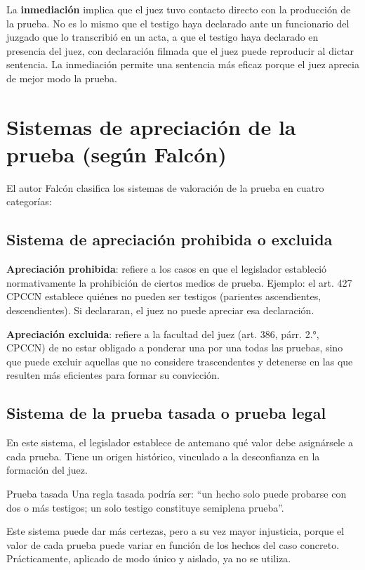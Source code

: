 \documentclass[12pt,oneside]{book}
\begin{document}
La \textbf{inmediación} implica que el juez tuvo contacto directo con la producción de la prueba. No es lo mismo que el testigo haya declarado ante un funcionario del juzgado que lo transcribió en un acta, a que el testigo haya declarado en presencia del juez, con declaración filmada que el juez puede reproducir al dictar sentencia. La inmediación permite una sentencia más eficaz porque el juez aprecia de mejor modo la prueba.

\section{Sistemas de apreciación de la prueba (según Falcón)}

El autor Falcón clasifica los sistemas de valoración de la prueba en cuatro categorías:

\subsection{Sistema de apreciación prohibida o excluida}

\textbf{Apreciación prohibida}: refiere a los casos en que el legislador estableció normativamente la prohibición de ciertos medios de prueba. Ejemplo: el art. 427 CPCCN establece quiénes no pueden ser testigos (parientes ascendientes, descendientes). Si declararan, el juez no puede apreciar esa declaración.

\textbf{Apreciación excluida}: refiere a la facultad del juez (art. 386, párr. 2.°, CPCCN) de no estar obligado a ponderar una por una todas las pruebas, sino que puede excluir aquellas que no considere trascendentes y detenerse en las que resulten más eficientes para formar su convicción.

\subsection{Sistema de la prueba tasada o prueba legal}

En este sistema, el legislador establece de antemano qué valor debe asignársele a cada prueba. Tiene un origen histórico, vinculado a la desconfianza en la formación del juez.

\begin{example}{Prueba tasada}
Una regla tasada podría ser: ``un hecho solo puede probarse con dos o más testigos; un solo testigo constituye semiplena prueba''.
\end{example}

Este sistema puede dar más certezas, pero a su vez mayor injusticia, porque el valor de cada prueba puede variar en función de los hechos del caso concreto. Prácticamente, aplicado de modo único y aislado, ya no se utiliza.
\end{document}
